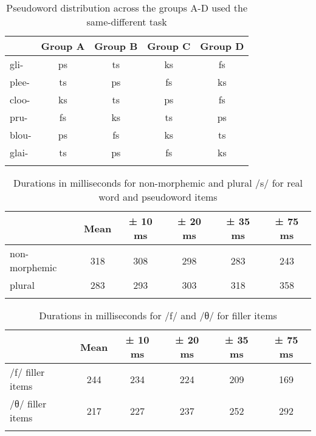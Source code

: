 \begin{table}[H]\fontsize{10}{11}
\caption{Pseudoword distribution across the groups A-D used the same-different task}
\label{tab:6.5}
\centering
\begin{tabular}{lcccc} 
\lsptoprule
~     & Group A & Group B & Group C & Group D  \\ 
\midrule
gli-  & ps      & ts      & ks      & fs       \\
plee- & ts      & ps      & fs      & ks       \\
cloo- & ks      & ts      & ps      & fs       \\
pru-  & fs      & ks      & ts      & ps       \\
blou- & ps      & fs      & ks      & ts       \\
glai- & ts      & ps      & fs      & ks       \\
\lspbottomrule
\end{tabular}
\end{table}





\begin{table}[H]\fontsize{10}{11}
\caption{Durations in milliseconds for non-morphemic and plural /s/ for real word and pseudoword items}
\label{tab:6.6}
\centering
\begin{tabular}{lccccc} 
\lsptoprule
~             & Mean & ± 10 ms & ± 20 ms & ± 35 ms & ± 75 ms  \\ 
\midrule
non-morphemic & 318  & 308     & 298     & 283     & 243      \\
plural        & 283  & 293     & 303     & 318     & 358      \\
\lspbottomrule
\end{tabular}
\end{table}





\begin{table}[H]\fontsize{10}{11}
\caption{Durations in milliseconds for /f/ and /θ/ for filler items}
\label{tab:6.7}
\centering
\begin{tabular}{lccccc} 
\lsptoprule
~             & Mean & ± 10 ms & ± 20 ms & ± 35 ms & ± 75 ms  \\ 
\midrule
/f/ filler items & 244  & 234     & 224     & 209     & 169      \\
/θ/ filler items & 217  & 227     & 237     & 252     & 292      \\
\lspbottomrule
\end{tabular}
\end{table}




